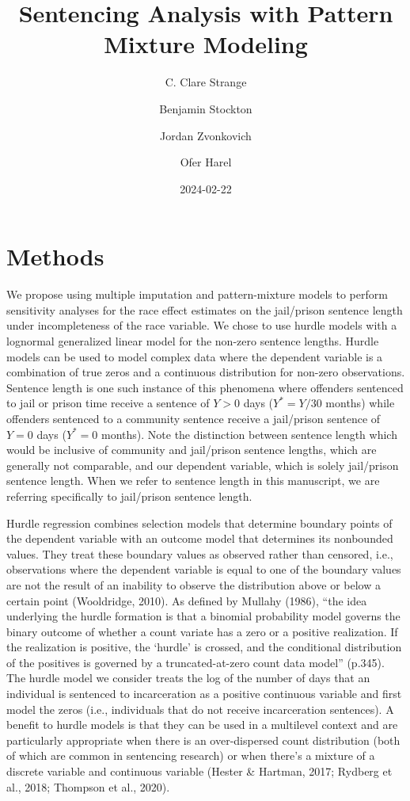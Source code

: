 \documentclass[
  letterpaper,
  DIV=11,
  numbers=noendperiod]{scrartcl}
\title{Sentencing Analysis with Pattern Mixture Modeling}
\author{C. Clare Strange \and Benjamin Stockton \and Jordan
Zvonkovich \and Ofer Harel}
\date{2024-02-22}
\begin{document}
\maketitle
\ifdefined\Shaded\renewenvironment{Shaded}{\begin{tcolorbox}[interior hidden, borderline west={3pt}{0pt}{shadecolor}, breakable, boxrule=0pt, enhanced, frame hidden, sharp corners]}{\end{tcolorbox}}\fi

\hypertarget{methods}{%
\section{Methods}\label{methods}}

We propose using multiple imputation and pattern-mixture models to
perform sensitivity analyses for the race effect estimates on the
jail/prison sentence length under incompleteness of the race variable.
We chose to use hurdle models with a lognormal generalized linear model
for the non-zero sentence lengths. Hurdle models can be used to model
complex data where the dependent variable is a combination of true zeros
and a continuous distribution for non-zero observations. Sentence length
is one such instance of this phenomena where offenders sentenced to jail
or prison time receive a sentence of \(Y > 0\) days (\(Y^* = Y/30\)
months) while offenders sentenced to a community sentence receive a
jail/prison sentence of \(Y = 0\) days (\(Y^* = 0\) months). Note the
distinction between sentence length which would be inclusive of
community and jail/prison sentence lengths, which are generally not
comparable, and our dependent variable, which is solely jail/prison
sentence length. When we refer to sentence length in this manuscript, we
are referring specifically to jail/prison sentence length.

Hurdle regression combines selection models that determine boundary
points of the dependent variable with an outcome model that determines
its nonbounded values. They treat these boundary values as observed
rather than censored, i.e., observations where the dependent variable is
equal to one of the boundary values are not the result of an inability
to observe the distribution above or below a certain point (Wooldridge,
2010). As defined by Mullahy (1986), ``the idea underlying the hurdle
formation is that a binomial probability model governs the binary
outcome of whether a count variate has a zero or a positive realization.
If the realization is positive, the `hurdle' is crossed, and the
conditional distribution of the positives is governed by a
truncated-at-zero count data model'' (p.345). The hurdle model we
consider treats the log of the number of days that an individual is
sentenced to incarceration as a positive continuous variable and first
model the zeros (i.e., individuals that do not receive incarceration
sentences). A benefit to hurdle models is that they can be used in a
multilevel context and are particularly appropriate when there is an
over-dispersed count distribution (both of which are common in
sentencing research) or when there's a mixture of a discrete variable
and continuous variable (Hester \& Hartman, 2017; Rydberg et al., 2018;
Thompson et al., 2020).
\end{document}
